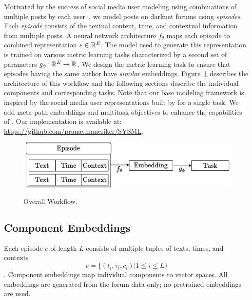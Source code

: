 \label{sec:sysml:method}
Motivated by the success of social media user modeling using combinations of multiple posts by each user~\cite{andrews2019learning,noorshams2020ties}, we model posts on darknet forums using \textit{episodes}.
Each \textit{episode} consists of the textual content, time, and contextual information from multiple posts. 
A neural network architecture $f_{\theta}$ maps each episode to combined representation $e \in \mathbb{R}^E$.
The model used to generate this representation is trained on various metric learning tasks characterized by a second set of parameters $g_{\phi}: \mathbb{R}^E \xrightarrow[]{} \mathbb{R}$.
We design the metric learning task to ensure that episodes having the same author have \textit{similar} embeddings.
Figure~\ref{fig:main_workflow} describes the architecture of this workflow and the following sections describe the individual components and corresponding tasks. 
Note that our base modeling framework is inspired by the social media user representations built by \citet{andrews2019learning} for a single task. 
We add meta-path embeddings and multitask objectives to enhance the capabilities of 
\SYSMLmethodname{}. 
Our implementation is available at: \url{https://github.com/pranavmaneriker/SYSML}.

\begin{figure}[!htbp]
    \centering
    \includegraphics[width=\linewidth,alt={Flowchart showing \SYSMLmethodname{} workflow.}]{sysml/figures/MainFlowchart.pdf}
    \caption{Overall \SYSMLmethodname{} Workflow.}
    \label{fig:main_workflow}
\end{figure}

\subsection{Component Embeddings}
Each episode $e$ of length $L$ consists of multiple tuples of texts, times, and contexts 
\[
    e = \{(t_i, \tau_i, c_i) | 1 \leq i \leq L\} 
\]. 
Component embeddings map individual components to vector spaces. 
All embeddings are generated from the forum data only; no pretrained embeddings are used.

